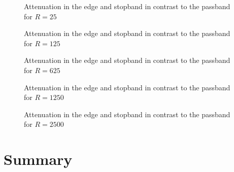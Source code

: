 \begin{figure}
    \centering
    
    \caption[Attenuation in the Edge and Stopband in Contrast to the Passband for R=25]{%
        Attenuation in the edge and stopband in contrast to the passband for $R=25$%
    }
    \label{fig:verification:fB25}
\end{figure}

\begin{figure}
    \centering
    
    \caption[Attenuation in the Edge and Stopband in Contrast to the Passband for R=125]{%
        Attenuation in the edge and stopband in contrast to the passband for $R=125$%
    }
    \label{fig:verification:fB125}
\end{figure}

\begin{figure}
    \centering
    
    \caption[Attenuation in the Edge and Stopband in Contrast to the Passband for R=625]{%
        Attenuation in the edge and stopband in contrast to the passband for $R=625$%
    }
    \label{fig:verification:fB625}
\end{figure}

\begin{figure}
    \centering
    
    \caption[Attenuation in the Edge and Stopband in Contrast to the Passband for R=1250]{%
        Attenuation in the edge and stopband in contrast to the passband for $R=1250$%
    }
    \label{fig:verification:fB5}
\end{figure}

\begin{figure}
    \centering
    
    \caption[Attenuation in the Edge and Stopband in Contrast to the Passband for R=2500]{%
        Attenuation in the edge and stopband in contrast to the passband for $R=2500$%
    }
    \label{fig:verification:fB5}
\end{figure}

%
%
\section{Summary} %
\label{sec:verification:summary}

